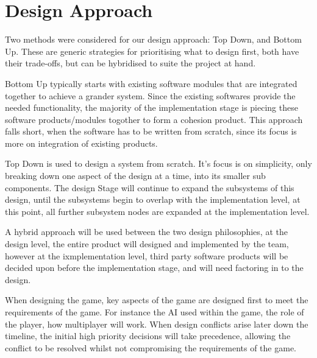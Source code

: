 \section{Design Approach}


Two methods were considered for our design approach: Top Down, and Bottom Up.
These are generic strategies for prioritising what to design first, both have their trade-offs, but can be hybridised to suite the project at hand.

Bottom Up typically starts with existing software modules that are integrated together to achieve a grander system.
Since the existing softwares provide the needed functionality, the majority of the implementation stage is piecing these software products/modules togother to form a cohesion product.
This approach falls short, when the software has to be written from scratch, since its focus is more on integration of existing products.

Top Down is used to design a system from scratch.
It's focus is on simplicity, only breaking down one aspect of the design at a time, into its smaller sub components.
The design Stage will continue to expand the subsystems of this design, until the subsystems begin to overlap with the implementation level, at this point, all further subsystem nodes are expanded at the implementation level.

A hybrid approach will be used between the two design philosophies, at the design level, the  entire product will designed and implemented by the team, however at the ixmplementation level, third party software products will be decided upon before the implementation stage, and will need factoring in to the design.

When designing the game, key aspects of the game are designed first to meet the requirements of the game. For instance the AI used within the game, the role of the player, how multiplayer will work.
When design conflicts arise later down the timeline, the initial high priority decisions will take precedence, allowing the conflict to be resolved whilst not compromising the requirements of the game.




